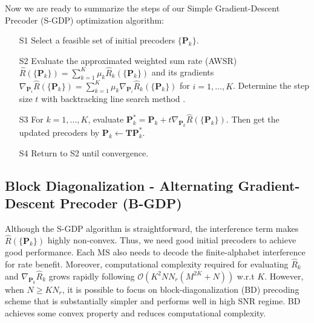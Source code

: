 \documentclass{article}
\begin{document}
    Now we are ready to summarize the steps of our Simple Gradient-Descent Precoder (S-GDP) optimization algorithm: %
    \begin{enumerate}\itemsep0pt\parskip0pt
        \item[S1] Select a feasible set of initial precoders $\{\mathbf{P}_k\}$.
        \item[S2] Evaluate the approximated weighted sum rate (AWSR) $\hat{R}(\{\mathbf{P}_k\}) = \sum_{k=1}^K\mu_k\hat{R}_k(\{\mathbf{P}_k\})$ and its gradients $\nabla_{\mathbf{P}_i}\hat{R}(\{\mathbf{P}_k\}) = \sum_{k=1}^K\mu_k\nabla_{\mathbf{P}_i}\hat{R}_k(\{\mathbf{P}_k\})$ for $i=1,\ldots,K$. Determine the step size $t$ with backtracking line search method \cite{boyd2004convex}.
        \item[S3] For $k=1,\ldots,K$, evaluate $\mathbf{P}_k^* = \mathbf{P}_k + t\nabla_{\mathbf{P}_k}\hat{R}(\{\mathbf{P}_k\})$. Then get the updated precoders by $\mathbf{P}_k \leftarrow \mathbf{TP}_k^*$.
        \item[S4] Return to S2 until convergence.
    \end{enumerate}

    \vspace*{-3mm}

    \subsection{Block Diagonalization - Alternating Gradient-Descent Precoder (B-GDP)}  %
    \label{ssec:BDAGDP}
    \vspace*{-2mm}

    Although the S-GDP algorithm is straightforward, the interference term makes $\hat{R}(\{\mathbf{P}_k\})$ highly non-convex.
    Thus, we need good initial precoders to achieve good performance.
    Each MS also needs to decode the finite-alphabet interference for rate benefit.
    Moreover, computational complexity required for evaluating $\hat{R}_k$ and $\nabla_{\mathbf{P}_k}\hat{R}_k$
    grows rapidly following $\mathcal{O}(K ^ 2NN_r(M^ {2K} + N))$  w.r.t $K$. However, when $N \geq KN_r$,
    it is possible to focus on block-diagonalization (BD) precoding scheme that is substantially simpler and
    performs well in high SNR regime.  BD achieves some convex property and reduces computational complexity.
\end{document}
